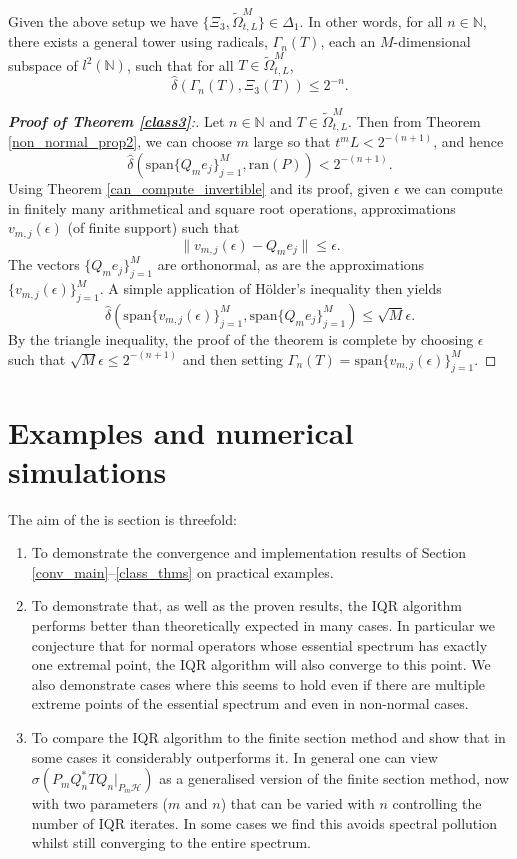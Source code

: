 \documentclass[a4paper,10pt]{article}
\begin{document}
\begin{theorem}
\label{class3}
Given the above setup we have $\{\Xi_3,\tilde\Omega^M_{t,L}\}\in \Delta_1.$ In other words, for all $n\in\mathbb{N}$, there exists a general tower using radicals, $\Gamma_n(T)$, each an $M$-dimensional subspace of $l^2(\mathbb{N})$, such that for all $T\in\tilde\Omega^M_{t,L}$,
$$
\hat \delta(\Gamma_n(T),\Xi_3(T))\leq 2^{-n}.
$$
\end{theorem}


\begin{proof}[\textbf{Proof of Theorem \ref{class3}}:]
Let $n\in\mathbb{N}$ and $T\in\tilde \Omega^M_{t,L}$. Then from Theorem \ref{non_normal_prop2}, we can choose $m$ large so that $t^mL<2^{-(n+1)}$, and hence
$$
\hat\delta(\mathrm{span}\{Q_me_j\}_{j=1}^M,\mathrm{ran}(P))<2^{-(n+1)}.
$$
Using Theorem \ref{can_compute_invertible} and its proof, given $\epsilon$ we can compute in finitely many arithmetical and square root operations, approximations $v_{m,j}(\epsilon)$ (of finite support) such that
$$
\|v_{m,j}(\epsilon)-Q_me_j\|\leq\epsilon.
$$
The vectors $\{Q_me_j\}_{j=1}^M$ are orthonormal, as are the approximations $\{v_{m,j}(\epsilon)\}_{j=1}^M$. A simple application of H\"older's inequality then yields
$$
\hat\delta(\mathrm{span}\{v_{m,j}(\epsilon)\}_{j=1}^M,\mathrm{span}\{Q_me_j\}_{j=1}^M)\leq \sqrt{M}\epsilon.
$$
By the triangle inequality, the proof of the theorem is complete by choosing $\epsilon$ such that $\sqrt{M}\epsilon\leq 2^{-(n+1)}$ and then setting $\Gamma_n(T)=\mathrm{span}\{v_{m,j}(\epsilon)\}_{j=1}^M$.
\end{proof}



\section{Examples and numerical simulations}
\label{sec_5}

The aim of the is section is threefold:
\begin{enumerate}
	\item To demonstrate the convergence and implementation results of Section \ref{conv_main}--\ref{class_thms} on practical examples.
	\item To demonstrate that, as well as the proven results, the IQR algorithm performs better than theoretically expected in many cases. In particular we conjecture that for normal operators whose essential spectrum has exactly one extremal point, the IQR algorithm will also converge to this point. We also demonstrate cases where this seems to hold even if there are multiple extreme points of the essential spectrum and even in non-normal cases.
	\item To compare the IQR algorithm to the finite section method and show that in some cases it considerably outperforms it. In general one can view $\sigma(P_mQ_n^*TQ_n|_{P_m\mathcal{H}})$ as a generalised version of the finite section method, now with two parameters ($m$ and $n$) that can be varied with $n$ controlling the number of IQR iterates. In some cases we find this avoids spectral pollution whilst still converging to the entire spectrum.
\end{enumerate}
\end{document}
